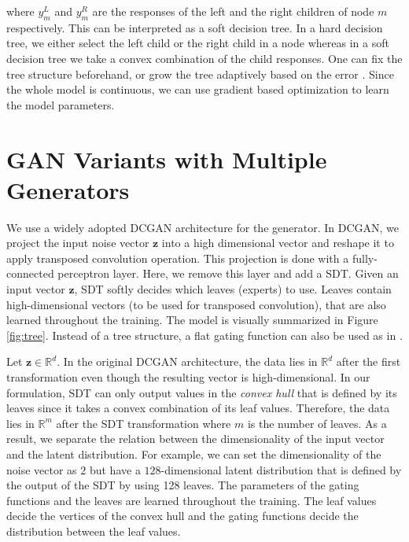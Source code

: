 \documentclass[a4paper,onesided,12pt]{report}
\begin{document}
where $y_m^L$ and $y_m^R$ are the responses of the left and the right children of node $m$ respectively. This can be interpreted as a soft decision tree. In a hard decision tree, we either select the left child or the right child in a node whereas in a soft decision tree we take a convex combination of the child responses. One can fix the tree structure beforehand, or grow the tree adaptively based on the error \cite{sdt, budding}. Since the whole model is continuous, we can use gradient based optimization to learn the model parameters.

\lipsum[5]

\section{GAN Variants with Multiple Generators}
\label{sec:related}

We use a widely adopted DCGAN \cite{dcgan} architecture for the generator. In DCGAN, we project the input noise vector $\boldsymbol{z}$ into a high dimensional vector and reshape it to apply transposed convolution operation. This projection is done with a fully-connected perceptron layer. Here, we remove this layer and add a SDT. Given an input vector $\boldsymbol{z}$, SDT softly decides which leaves (experts) to use. Leaves contain high-dimensional vectors (to be used for transposed convolution), that are also learned throughout the training. The model is visually summarized in Figure \ref{fig:tree}. Instead of a tree structure, a flat gating function can also be used as in \cite{me}.

Let $\boldsymbol{z} \in \mathbb{R}^{d}$. In the original DCGAN architecture, the data lies in $\mathbb{R}^{d}$ after the first transformation even though the resulting vector is high-dimensional. In our formulation, SDT can only output values in the \emph{convex hull} that is defined by its leaves since it takes a convex combination of its leaf values. Therefore, the data lies in $\mathbb{R}^m$ after the SDT transformation where $m$ is the number of leaves. As a result, we separate the relation between the dimensionality of the input vector and the latent distribution. For example, we can set the dimensionality of the noise vector as $2$ but have a $128$-dimensional latent distribution that is defined by the output of the SDT by using 128 leaves. The parameters of the gating functions and the leaves are learned throughout the training. The leaf values decide the vertices of the convex hull and the gating functions decide the distribution between the leaf values.
\end{document}
